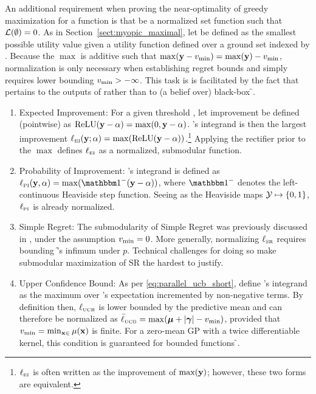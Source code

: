 An additional requirement when proving the near-optimality of greedy maximization for a \SM{} function \Acq{} is that \Acq{} be a normalized set function such that \(\mathcal{L}(\emptyset) = 0\).
As in Section~\ref{sect:myopic_maximal}, let \lboundAcq{} be defined as the smallest possible utility value given a utility function \acq{} defined over a ground set  indexed by \xspace{}. Because the \(\max\) is additive such that \(\max(\mathbf{y} - v_{\min}) = \max(\mathbf{y}) - v_{\min}\), normalization is only necessary when establishing regret bounds and simply requires lower bounding \(v_{\min}{} > -\infty\). This task is is facilitated by the fact that \lboundAcq{} pertains to the outputs of \acq{} rather than to (a belief over) black-box \f{}.
% 
\begin{enumerate}[label=\alph*.,leftmargin=16pt]
%
\item Expected Improvement: For a given threshold \level{}, let improvement be defined (pointwise) as \(\operatorname{ReLU}(\mathbf{y} - \alpha) = \max(0, \mathbf{y} - \alpha)\). \EI's integrand is then the largest improvement \(\ell_{\scriptscriptstyle{\ensuremath{\operatorname{EI}}}}(\mathbf{y}; \alpha) = \max(\operatorname{ReLU}(\mathbf{y} - \alpha))\).\footnote{\(\ell_{\scriptscriptstyle{\ensuremath{\operatorname{EI}}}}\) is often written as the improvement of \(\max(\mathbf{y})\); however, these two forms are equivalent.} Applying the rectifier prior to the \(\max\) defines \(\ell_{\scriptscriptstyle{\ensuremath{\operatorname{EI}}}}\) as a normalized, submodular function.
% 
\item Probability of Improvement: \PI's integrand is defined as \(\acq_{\acqSubscript{\PI}}(\Y, \alpha) = \max(\heaviside^{-}(\Y - \alpha))\), where \(\heaviside^{-}\) denotes the left-continuous Heaviside step function. Seeing as the Heaviside maps \(\mathcal{Y} \mapsto \{0,1\}\), \(\ell_{\scriptscriptstyle{\ensuremath{\operatorname{PI}}}}\) is already normalized.
% 
\item Simple Regret: The submodularity of Simple Regret was previously discussed in \cite{azimi2010batch}, under the assumption \(v_{\min} = 0\). More generally, normalizing \(\ell_{\scriptscriptstyle{\ensuremath{\operatorname{SR}}}}\) requires bounding \f's infimum under \(p\). Technical challenges for doing so make submodular maximization of SR the hardest to justify.
% 
\item Upper Confidence Bound: As per \eqref{eq:parallel_ucb_short}, define \UCB's integrand as the maximum over \Y's expectation incremented by non-negative terms. 
%
By definition then, \(\ell_{\scriptscriptstyle{\ensuremath{\operatorname{UCB}}}}\) is lower bounded by the predictive mean and can therefore be normalized as \(\bar{\ell}_{\scriptscriptstyle{\ensuremath{\operatorname{UCB}}}} = \max(\boldsymbol{\mu} + \lvert\boldsymbol{\gamma}\rvert - v_{\min})\), provided that \(v_{\min} = \min_{\mathbf{x} \in }\mu(\mathbf{x})\) is finite. 
% 
For a zero-mean GP with a twice differentiable kernel, this condition is guaranteed for bounded functions \f{}.
\end{enumerate}



